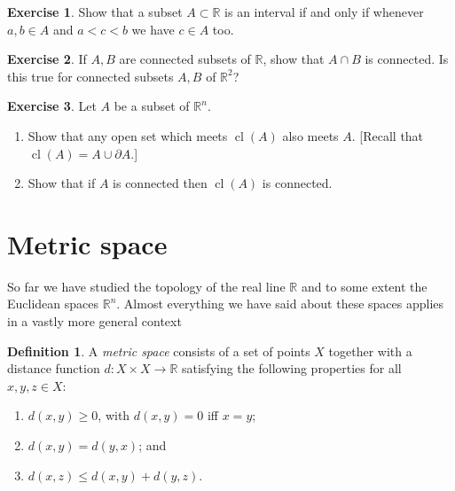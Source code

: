 \documentclass[11pt,oneside]{amsbook}
\newcommand{\R}{\mathbb R}
\DeclareMathOperator{\cl}{cl}
\theoremstyle{definition}
\newtheorem{exerc}{Exercise}[section]
\theoremstyle{plain}
\theoremstyle{definition}
\newtheorem{definition}[theorem]{Definition}
\theoremstyle{remark}
\numberwithin{equation}{section}
\numberwithin{figure}{section}
\begin{document}
\begin{exerc}
  Show that a subset $A\subset\R$ is an interval if and only if whenever $a,b\in A$ and $a<c<b$ we have $c\in A$ too.
\end{exerc}


\begin{exerc}
  If $A,B$ are connected subsets of $\R$, show that $A\cap B$ is connected. Is this true for connected subsets $A,B$ of $\R^2$?
\end{exerc}

\begin{exerc}
  Let $A$ be a subset of $\R^n$.
  \begin{enumerate}
    \item Show that any open set which meets $\cl(A)$ also meets $A$. [Recall that $\cl(A)=A\cup\partial A$.]
    \item Show that if $A$ is connected then $\cl(A)$ is connected.
  \end{enumerate}
\end{exerc}


\newpage
\section{Metric space}

So far we have studied the topology of the real line $\R$ and to some extent the Euclidean spaces $\R^n$. Almost everything we have said about these spaces applies in a vastly more general context

\begin{definition}
  A \emph{metric space} consists of a set of points $X$ together with a distance function $d\colon X\times X\to\R$ satisfying the following properties for all $x,y,z\in X$:
  \begin{enumerate}
  \item $d(x,y)\geq0$, with $d(x,y)=0$ iff $x=y$;
  \item $d(x,y)=d(y,x)$; and
  \item $d(x,z)\leq d(x,y)+d(y,z)$.
  \end{enumerate}
\end{definition}
\end{document}
